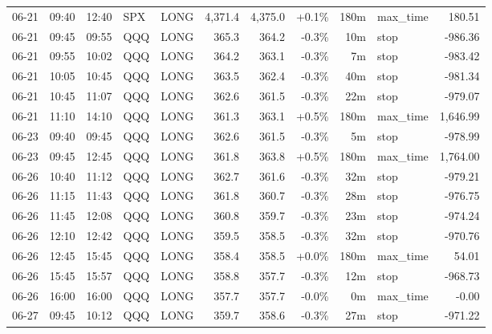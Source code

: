 \documentclass[11pt,a4paper,twoside]{article}
\begin{document}
\begin{center}
\begin{longtable}{>{\color{txtmain}}l l l l l r r r r >{\color{txtmain}}l r}
06-21 & 09:40 & 12:40 & SPX & LONG & 4,371.4 & 4,375.0 & \textcolor{wingreen}{+0.1\%} & 180m & max\_time & \textcolor{wingreen}{180.51} \\
06-21 & 09:45 & 09:55 & QQQ & LONG & 365.3 & 364.2 & \textcolor{lossred}{-0.3\%} & 10m & stop & \textcolor{lossred}{-986.36} \\
06-21 & 09:55 & 10:02 & QQQ & LONG & 364.2 & 363.1 & \textcolor{lossred}{-0.3\%} & 7m & stop & \textcolor{lossred}{-983.42} \\
06-21 & 10:05 & 10:45 & QQQ & LONG & 363.5 & 362.4 & \textcolor{lossred}{-0.3\%} & 40m & stop & \textcolor{lossred}{-981.34} \\
06-21 & 10:45 & 11:07 & QQQ & LONG & 362.6 & 361.5 & \textcolor{lossred}{-0.3\%} & 22m & stop & \textcolor{lossred}{-979.07} \\
06-21 & 11:10 & 14:10 & QQQ & LONG & 361.3 & 363.1 & \textcolor{wingreen}{+0.5\%} & 180m & max\_time & \textcolor{wingreen}{1,646.99} \\
06-23 & 09:40 & 09:45 & QQQ & LONG & 362.6 & 361.5 & \textcolor{lossred}{-0.3\%} & 5m & stop & \textcolor{lossred}{-978.99} \\
06-23 & 09:45 & 12:45 & QQQ & LONG & 361.8 & 363.8 & \textcolor{wingreen}{+0.5\%} & 180m & max\_time & \textcolor{wingreen}{1,764.00} \\
06-26 & 10:40 & 11:12 & QQQ & LONG & 362.7 & 361.6 & \textcolor{lossred}{-0.3\%} & 32m & stop & \textcolor{lossred}{-979.21} \\
06-26 & 11:15 & 11:43 & QQQ & LONG & 361.8 & 360.7 & \textcolor{lossred}{-0.3\%} & 28m & stop & \textcolor{lossred}{-976.75} \\
06-26 & 11:45 & 12:08 & QQQ & LONG & 360.8 & 359.7 & \textcolor{lossred}{-0.3\%} & 23m & stop & \textcolor{lossred}{-974.24} \\
06-26 & 12:10 & 12:42 & QQQ & LONG & 359.5 & 358.5 & \textcolor{lossred}{-0.3\%} & 32m & stop & \textcolor{lossred}{-970.76} \\
06-26 & 12:45 & 15:45 & QQQ & LONG & 358.4 & 358.5 & \textcolor{wingreen}{+0.0\%} & 180m & max\_time & \textcolor{wingreen}{54.01} \\
06-26 & 15:45 & 15:57 & QQQ & LONG & 358.8 & 357.7 & \textcolor{lossred}{-0.3\%} & 12m & stop & \textcolor{lossred}{-968.73} \\
06-26 & 16:00 & 16:00 & QQQ & LONG & 357.7 & 357.7 & \textcolor{lossred}{-0.0\%} & 0m & max\_time & \textcolor{lossred}{-0.00} \\
06-27 & 09:45 & 10:12 & QQQ & LONG & 359.7 & 358.6 & \textcolor{lossred}{-0.3\%} & 27m & stop & \textcolor{lossred}{-971.22} \\

\end{longtable}
\end{center}
\end{document}
